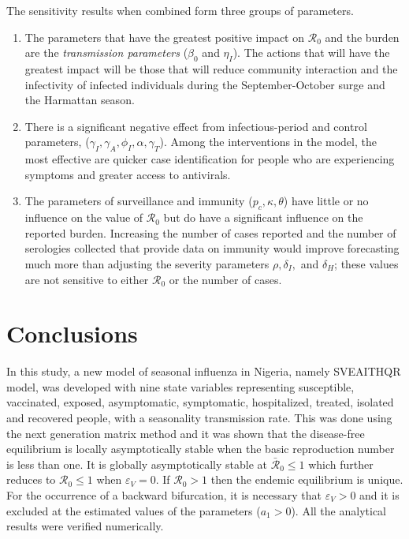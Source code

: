 \documentclass[12pt,a4paper]{article}
\theoremstyle{definition}
\theoremstyle{remark}
\begin{document}
The sensitivity results when combined form three groups of parameters.
\begin{enumerate}[label=(\roman*)]
\item The parameters that have the greatest positive impact on $\mathcal{R}_0$ and the burden are the \emph{transmission parameters} ($\beta_0$ and $\eta_I$). The actions that will have the greatest impact will be those that will reduce community interaction and the infectivity of infected individuals during the September-October surge and the Harmattan season.
\item There is a significant negative effect from infectious-period and control parameters, ($\gamma_I, \gamma_A, \phi_I, \alpha, \gamma_T$). Among the interventions in the model, the most effective are quicker case identification for people who are experiencing symptoms and greater access to antivirals.
\item The parameters of surveillance and immunity ($p_c, \kappa, \theta$) have little or no influence on the value of $\mathcal{R}_0$ but do have a significant influence on the reported burden. Increasing the number of cases reported and the number of serologies collected that provide data on immunity would improve forecasting much more than adjusting the severity parameters $\rho, \delta_I,$ and $\delta_H$; these values are not sensitive to either $\mathcal{R}_0$ or the number of cases.

\end{enumerate}




\section{Conclusions} \label{s5}

In this study, a new model of seasonal influenza in Nigeria, namely SVEAITHQR model, was developed with nine state variables representing susceptible, vaccinated, exposed, asymptomatic, symptomatic, hospitalized, treated, isolated and recovered people, with a seasonality transmission rate. This was done using the next generation matrix method and it was shown that the disease-free equilibrium is locally asymptotically stable when the basic reproduction number is less than one. It is globally asymptotically stable at $\bar{\mathcal{R}}_0 \le 1$ which further reduces to $\mathcal{R}_0 \le 1$ when $\varepsilon_V = 0$. If $\mathcal{R}_0>1$ then the endemic equilibrium is unique. For the occurrence of a backward bifurcation, it is necessary that $\varepsilon_V > 0$ and it is excluded at the estimated values of the parameters ($a_1>0$). All the analytical results were verified numerically.
\end{document}

